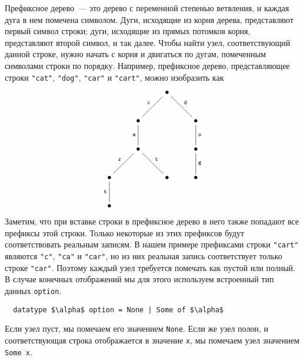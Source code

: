 Префиксное дерево~--- это дерево с переменной степенью ветвления, и
каждая дуга в нем помечена символом. Дуги, исходящие из корня дерева,
представляют первый символ строки; дуги, исходящие из прямых потомков
корня, представляют второй символ, и так далее. Чтобы найти узел,
соответствующий данной строке, нужно начать с корня и двигаться по
дугам, помеченным символами строки по порядку.  Например, префиксное
дерево, представляющее строки \lstinline!"cat"!, \lstinline!"dog"!,
\lstinline!"car"! и \lstinline!"cart"!, можно изобразить как
$$
\begin{xy}
  \xymatrix{
    & & \bullet \ar@{-}[dl]_{\mathtt{c}} \ar@{-}[dr]^{\mathtt{d}} & \\
    & \bullet \ar@{-}[d]_{\mathtt{a}} & & \bullet \ar@{-}[d]^{\mathtt{o}} \\
    & \bullet \ar@{-}[dl]_{\mathtt{r}} \ar@{-}[dr]^{\mathtt{t}} & & \bullet \ar@{-}[d]^{\mathtt{g}} \\
    \bullet \ar@{-}[d]_{\mathtt{t}} & & \bullet & \bullet \\
    \bullet \\
  }
\end{xy}
$$
Заметим, что при вставке строки в префиксное дерево в него также
попадают все префиксы этой строки. Только некоторые из этих префиксов
будут соответствовать реальным записям.  В нашем примере префиксами
строки \lstinline!"cart"! являются \lstinline!"c"!, \lstinline!"ca"! и \lstinline!"car"!, но
из них реальная запись соответствует только строке \lstinline!"car"!. Поэтому
каждый узел требуется помечать как пустой или полный. В случае
конечных отображений мы для этого используем встроенный тип данных
\lstinline!option!.
\begin{lstlisting}
  datatype $\alpha$ option = None | Some of $\alpha$
\end{lstlisting}
Если узел пуст, мы помечаем его значением \lstinline!None!. Если же
узел полон, и соответствующая строка отображается в значение
\lstinline!x!, мы помечаем узел значением \lstinline!Some x!.

